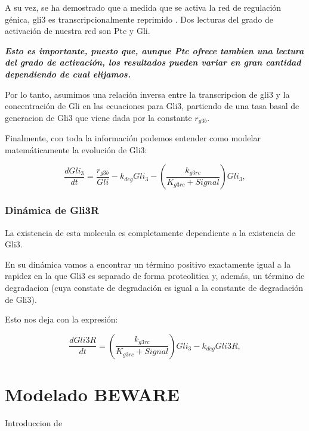  A su vez, se ha demostrado que a medida que se activa la red de regulación génica, gli3 es transcripcionalmente
 reprimido \cite{wang2000hedgehog}. Dos lecturas del grado de activación de nuestra red son Ptc y Gli. 
 
 \textbf{\textit{Esto es importante, puesto que, aunque Ptc ofrece tambien una lectura del grado de activación, los resultados pueden variar en gran cantidad dependiendo de cual elijamos.}}
 
 Por lo tanto, asumimos una relación inversa entre la transcripcion de gli3 y la concentración de Gli en las ecuaciones para Gli3, partiendo de una tasa basal de generacion de Gli3 que viene dada por la constante $r_{g3b}$. 
 
 Finalmente, con toda la información podemos entender como modelar matemáticamente la evolución de Gli3:
 
  \begin{equation}
  \frac{dGli_3}{dt} = \frac{r_{g3b}}{Gli}-k_{deg}Gli_3-\left(\frac{k_{g3rc}}{K_{g3rc}+Signal}\right)Gli_3,
  \end{equation}
 
 \subsubsection{Dinámica de Gli3R}
 La existencia de esta molecula es completamente dependiente a la existencia de Gli3.
 
 En su dinámica vamos a encontrar un término positivo exactamente igual a la rapidez en la que Gli3 es separado de forma proteolitica y, además, un término de degradacion (cuya constate de degradación es igual a la constante de degradación de Gli3).
 
  Esto nos deja con la expresión:

 
 \begin{equation}
 \frac{dGli3R}{dt}= \left(\frac{k_{g3rc}}{K_{g3rc}+Signal}\right)Gli_3-k_{deg}Gli3R,
 \end{equation}
 
 \section{Modelado BEWARE}
Introduccion de  \cite{ay2011mathematical}
 \cite{bintu2005transcriptional} \cite{bintu2005transcriptional2}
 \cite{fakhouri2010deciphering}
 \cite{he2010thermodynamics}
 \cite{segal2008predicting}